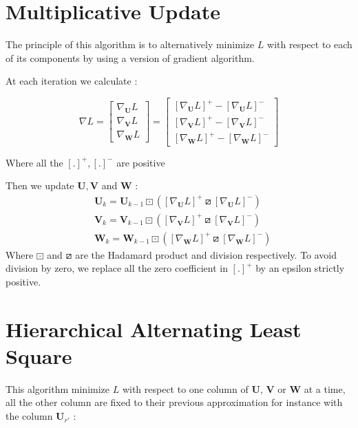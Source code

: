\documentclass{article}
\begin{document}
\section{Multiplicative Update}
The principle of this algorithm is to alternatively minimize $L$ with respect to each of its components by
using a version of gradient algorithm.

At each iteration we calculate :

\[\nabla L = \begin{bmatrix}
                \nabla_{\mathbf{U}} L\\
                \nabla_{\mathbf{V}} L \\
                \nabla_{\mathbf{W}} L 
            \end{bmatrix} = \begin{bmatrix}
                                [\nabla_{\mathbf{U}} L]^{+}-[\nabla_{\mathbf{U}} L]^{-}\\
                                [\nabla_{\mathbf{V}} L]^{+}-[\nabla_{\mathbf{V}} L]^{-} \\
                                [\nabla_{\mathbf{W}} L]^{+}-[\nabla_{\mathbf{W}} L]^{-} 
                            \end{bmatrix}
\]

Where all the $[.]^{+}, [.]^{-}$ are positive

Then we update $\mathbf{U}, \mathbf{V}$ and $\mathbf{W}$ :
\begin{align*}
    &\mathbf{U}_{k} = \mathbf{U}_{k-1}\boxdot ([\nabla_{\mathbf{U}} L]^{+}\boxslash[\nabla_{\mathbf{U}} L]^{-}) \\
    &\mathbf{V}_{k} = \mathbf{V}_{k-1}\boxdot ([\nabla_{\mathbf{V}} L]^{+}\boxslash[\nabla_{\mathbf{V}} L]^{-}) \\
    &\mathbf{W}_{k} = \mathbf{W}_{k-1}\boxdot ([\nabla_{\mathbf{W}} L]^{+}\boxslash[\nabla_{\mathbf{W}} L]^{-})
\end{align*}
Where $\boxdot$ and $\boxslash$ are the Hadamard product and division respectively. To avoid division by zero, we replace all the zero coefficient in $[.]^{+}$ by an epsilon strictly positive.




\section{Hierarchical Alternating Least Square}
This algorithm minimize $L$ with respect to one column of $\mathbf{U}$, $\mathbf{V}$ or $\mathbf{W}$ at a time, all the other column are fixed to their previous approximation
for instance with the column $\mathbf{U}_{r'}$ :
\end{document}
